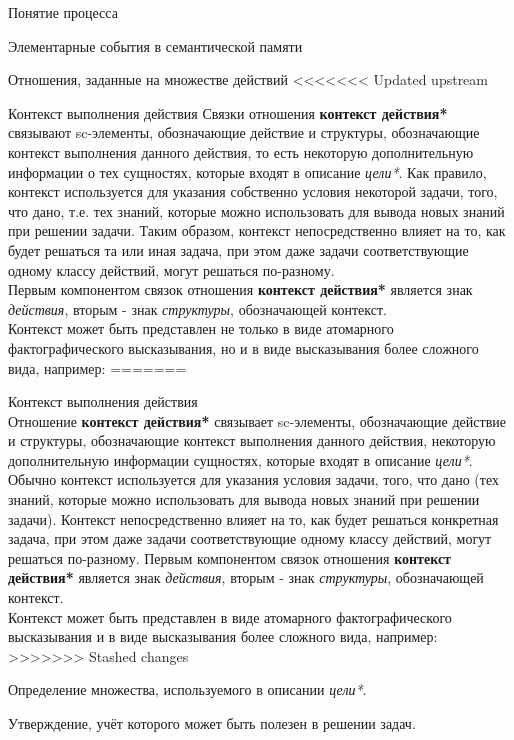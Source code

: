 \begin{frame}{\large Понятие процесса}
\begin{frame}{\large Элементарные события в семантической памяти}
\begin{frame}{Отношения, заданные на множестве действий}
<<<<<<< Updated upstream
\begin{frame}{\large Контекст выполнения действия}
\vspace{30}
    Связки отношения \textbf{контекст действия*} связывают sc-элементы, обозначающие действие и структуры, обозначающие контекст выполнения данного действия, то есть некоторую дополнительную информации о тех сущностях, которые входят в описание \textit{цели*}. Как правило, контекст используется для указания собственно условия некоторой задачи, того, что дано, т.е. тех знаний, которые можно использовать для вывода новых знаний при решении задачи. Таким образом, контекст непосредственно влияет на то, как будет решаться та или иная задача, при этом даже задачи соответствующие одному классу действий, могут решаться по-разному.\\
    Первым компонентом связок отношения \textbf{контекст действия*} является знак \textit{действия}, вторым - знак \textit{структуры}, обозначающей контекст.\\
    Контекст может быть представлен не только в виде атомарного фактографического высказывания, но и в виде высказывания более сложного вида, например:
=======
\begin{frame}{Контекст выполнения действия}
\topline
\justifying
 \\
 \bigskip
 \vspace{30}
    Отношение \textbf{контекст действия*} связывает sc-элементы, обозначающие действие и структуры, обозначающие контекст выполнения данного действия, некоторую дополнительную информации сущностях, которые входят в описание \textit{цели*}. Обычно контекст используется для указания условия задачи, того, что дано (тех знаний, которые можно использовать для вывода новых знаний при решении задачи). Контекст непосредственно влияет на то, как будет решаться конкретная задача, при этом даже задачи соответствующие одному классу действий, могут решаться по-разному.
    Первым компонентом связок отношения \textbf{контекст действия*} является знак \textit{действия}, вторым - знак \textit{структуры}, обозначающей контекст.\\
    Контекст может быть представлен в виде атомарного фактографического высказывания и в виде высказывания более сложного вида, например:
>>>>>>> Stashed changes
    \begin{textitemize}
        \item Определение множества, используемого в описании \textit{цели*}.
        \item Утверждение, учёт которого может быть полезен в решении задач.
    \end{textitemize}
\end{frame}


\end{frame}
\end{frame}
\end{frame}
\end{frame}

